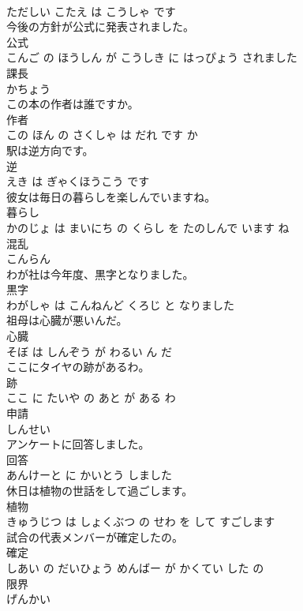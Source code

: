 \documentclass[8pt]{extreport}
\begin{document}
\begin{CJK}{UTF8}{min}
\\	ただしい こたえ は こうしゃ です			
\\	今後の方針が公式に発表されました。	
\\	公式 
\\	こんご の ほうしん が こうしき に はっぴょう されました			
\\	課長	
\\	かちょう			
\\	この本の作者は誰ですか。	
\\	作者 
\\	この ほん の さくしゃ は だれ です か			
\\	駅は逆方向です。	
\\	逆 
\\	えき は ぎゃくほうこう です			
\\	彼女は毎日の暮らしを楽しんでいますね。	
\\	暮らし 
\\	かのじょ は まいにち の くらし を たのしんで います ね			
\\	混乱	
\\	こんらん			
\\	わが社は今年度、黒字となりました。	
\\	黒字 
\\	わがしゃ は こんねんど くろじ と なりました			
\\	祖母は心臓が悪いんだ。	
\\	心臓 
\\	そぼ は しんぞう が わるい ん だ			
\\	ここにタイヤの跡があるわ。	
\\	跡 
\\	ここ に たいや の あと が ある わ			
\\	申請	
\\	しんせい			
\\	アンケートに回答しました。	
\\	回答 
\\	あんけーと に かいとう しました			
\\	休日は植物の世話をして過ごします。	
\\	植物 
\\	きゅうじつ は しょくぶつ の せわ を して すごします			
\\	試合の代表メンバーが確定したの。	
\\	確定 
\\	しあい の だいひょう めんばー が かくてい した の			
\\	限界	
\\	げんかい			

\end{CJK}
\end{document}
